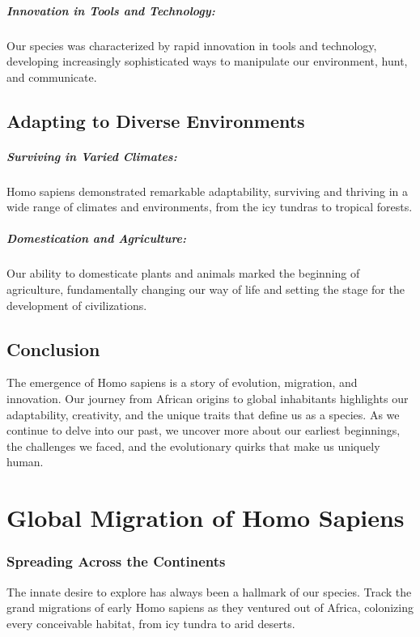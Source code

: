 \documentclass[a4paper,12pt]{book}
\begin{document}
\paragraph{Innovation in Tools and Technology:}
Our species was characterized by rapid innovation in tools and technology, developing increasingly sophisticated ways to manipulate our environment, hunt, and communicate.

\section*{Adapting to Diverse Environments}

\paragraph{Surviving in Varied Climates:}
Homo sapiens demonstrated remarkable adaptability, surviving and thriving in a wide range of climates and environments, from the icy tundras to tropical forests.

\paragraph{Domestication and Agriculture:}
Our ability to domesticate plants and animals marked the beginning of agriculture, fundamentally changing our way of life and setting the stage for the development of civilizations.

\section*{Conclusion}

The emergence of Homo sapiens is a story of evolution, migration, and innovation. Our journey from African origins to global inhabitants highlights our adaptability, creativity, and the unique traits that define us as a species. As we continue to delve into our past, we uncover more about our earliest beginnings, the challenges we faced, and the evolutionary quirks that make us uniquely human.

\chapter{Global Migration of Homo Sapiens}
\subsection*{Spreading Across the Continents}
The innate desire to explore has always been a hallmark of our species. Track the grand migrations of early Homo sapiens as they ventured out of Africa, colonizing every conceivable habitat, from icy tundra to arid deserts.
\end{document}
